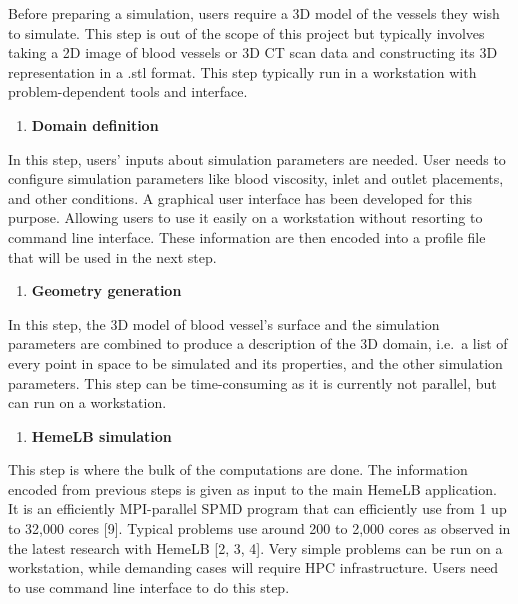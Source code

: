 \documentclass[]{article}
\providecommand{\tightlist}{%
  \setlength{\itemsep}{0pt}\setlength{\parskip}{0pt}}
\begin{document}
Before preparing a simulation, users require a 3D model of the vessels
they wish to simulate. This step is out of the scope of this project but
typically involves taking a 2D image of blood vessels or 3D CT scan data
and constructing its 3D representation in a .stl format. This step
typically run in a workstation with problem-dependent tools and
interface.

\begin{enumerate}
\def\labelenumi{\arabic{enumi}.}
\setcounter{enumi}{1}
\tightlist
\item
  \textbf{Domain definition}
\end{enumerate}

In this step, users' inputs about simulation parameters are needed. User
needs to configure simulation parameters like blood viscosity, inlet and
outlet placements, and other conditions. A graphical user interface has
been developed for this purpose. Allowing users to use it easily on a
workstation without resorting to command line interface. These
information are then encoded into a profile file that will be used in
the next step.

\begin{enumerate}
\def\labelenumi{\arabic{enumi}.}
\setcounter{enumi}{2}
\tightlist
\item
  \textbf{Geometry generation}
\end{enumerate}

In this step, the 3D model of blood vessel's surface and the simulation
parameters are combined to produce a description of the 3D domain,
i.e.~a list of every point in space to be simulated and its properties,
and the other simulation parameters. This step can be time-consuming as
it is currently not parallel, but can run on a workstation.

\begin{enumerate}
\def\labelenumi{\arabic{enumi}.}
\setcounter{enumi}{3}
\tightlist
\item
  \textbf{HemeLB simulation}
\end{enumerate}

This step is where the bulk of the computations are done. The
information encoded from previous steps is given as input to the main
HemeLB application. It is an efficiently MPI-parallel SPMD program that
can efficiently use from 1 up to 32,000 cores {[}9{]}. Typical problems
use around 200 to 2,000 cores as observed in the latest research with
HemeLB {[}2, 3, 4{]}. Very simple problems can be run on a workstation,
while demanding cases will require HPC infrastructure. Users need to use
command line interface to do this step.
\end{document}
